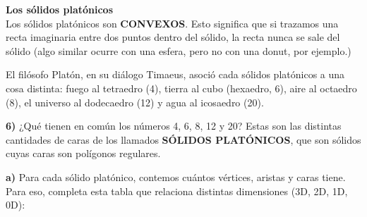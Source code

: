 \documentclass[12pt,a4paper]{article}
\begin{document}
\begin{multicols}{2}
 \textbf{Los sólidos platónicos}  \\
Los sólidos platónicos son \textbf{CONVEXOS}. Esto significa que si trazamos una recta imaginaria entre dos puntos dentro del sólido, la recta nunca se sale del sólido (algo similar ocurre con una esfera, pero no con una donut, por ejemplo.)

El filósofo Platón, en su diálogo Timaeus, asoció cada sólidos platónicos a una cosa distinta: fuego al tetraedro (4), tierra al cubo (hexaedro, 6), aire al octaedro (8), el universo al dodecaedro (12) y agua al icosaedro (20).

\textbf{6)}  ¿Qué tienen en común los números 4, 6, 8, 12 y 20? Estas son las distintas cantidades de caras de los llamados \textbf{SÓLIDOS PLATÓNICOS}, que son sólidos cuyas caras son polígonos regulares.

\textbf{a)} Para cada sólido platónico, contemos cuántos vértices, aristas y caras tiene. Para eso, completa esta tabla que relaciona distintas dimensiones (3D, 2D, 1D, 0D):


\end{multicols}
\end{document}
